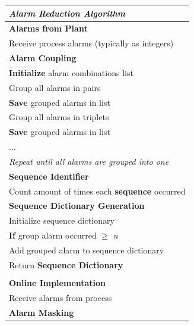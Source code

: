 \clearpage
\begin{table}[H]
    {
	\centering
	\begin{tabular}{p{14cm}}
	\hline
	\emph{Alarm Reduction Algorithm} \\
	\hline
	\textbf{Alarms from Plant} \\
	\hspace{0.5cm} Receive process alarms (typically as integers) \\
	\textbf{Alarm Coupling} \\
	\hspace{0.5cm} \textbf{Initialize} alarm combinations list \\
	\hspace{0.5cm} Group all alarms in pairs \\ 
	\hspace{1cm} \textbf{Save} grouped alarms in list \\
	\hspace{0.5cm} Group all alarms in triplets \\
	\hspace{1cm} \textbf{Save} grouped alarms in list \\
	\hspace{0.5cm} ... \\
	\hspace{0.5cm} \textit{Repeat until all alarms are grouped into one} \\
	\textbf{Sequence Identifier} \\ 
	\hspace{0.5cm} Count amount of times each \textbf{sequence} occurred \\
	\textbf{Sequence Dictionary Generation} \\
	\hspace{0.5cm} Initialize sequence dictionary \\
	\hspace{0.5cm} \textbf{If} group alarm occurred $\geq$ \emph{n} \\
	\hspace{1cm} Add grouped alarm to sequence dictionary \\
	\hspace{0.5cm} Return \textbf{Sequence Dictionary} \\
	\\
	\textbf{Online Implementation} \\
	\hspace{0.5cm} Receive alarms from process\\
	\hspace{0.5cm} \textbf{Alarm Masking} \\

\end{tabular}}
\end{table}
